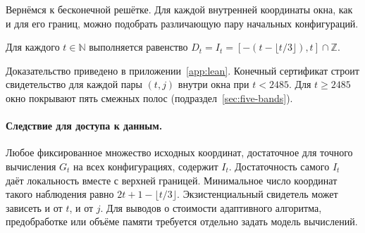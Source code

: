 Вернёмся к бесконечной решётке. Для каждой внутренней координаты окна, как и для его границ, можно подобрать различающую пару начальных конфигураций.

\begin{theorem}\label{thm:gap-free}
Для каждого $t \in \mathbb{N}$ выполняется равенство $D_t = I_t = [-(t - \lfloor t/3 \rfloor), t] \cap \mathbb{Z}$.
\end{theorem}

Доказательство приведено в приложении~\ref{app:lean}. Конечный сертификат строит свидетельство для каждой пары $(t,j)$ внутри окна при $t<2485$. Для $t\ge2485$ окно покрывают пять смежных полос (подраздел~\ref{sec:five-bands}).

\paragraph{Следствие для доступа к данным.}
Любое фиксированное множество исходных координат, достаточное для точного вычисления $G_t$ на всех конфигурациях, содержит $I_t$. Достаточность самого $I_t$ даёт локальность вместе с верхней границей. Минимальное число координат такого наблюдения равно $2t+1-\lfloor t/3\rfloor$. Экзистенциальный свидетель может зависеть и от $t$, и от $j$. Для выводов о стоимости адаптивного алгоритма, предобработке или объёме памяти требуется отдельно задать модель вычислений.
